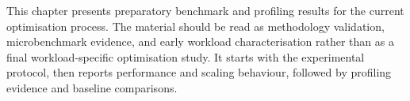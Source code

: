 This chapter presents preparatory benchmark and profiling results for the
current optimisation process. The material should be read as methodology
validation, microbenchmark evidence, and early workload characterisation rather
than as a final workload-specific optimisation study. It starts with the
experimental protocol, then reports performance and scaling behaviour, followed
by profiling evidence and baseline comparisons.









